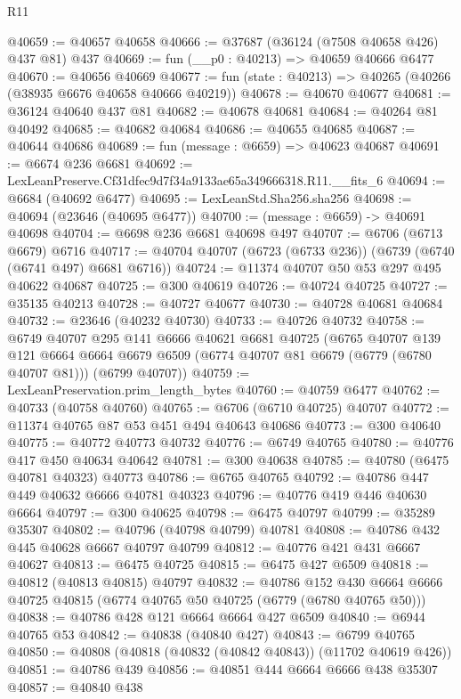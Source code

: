 \begin{lexlean}{R11}
\begin{coremodule}
@40659 := @40657 @40658
@40666 := @37687 (@36124 (@7508 @40658 @426) @437 @81) @437
@40669 := fun (__p0 : @40213) => @40659 @40666 @6477
@40670 := @40656 @40669
@40677 := fun (state : @40213) => @40265 (@40266 (@38935 @6676 @40658 @40666 @40219))
@40678 := @40670 @40677
@40681 := @36124 @40640 @437 @81
@40682 := @40678 @40681
@40684 := @40264 @81 @40492
@40685 := @40682 @40684
@40686 := @40655 @40685
@40687 := @40644 @40686
@40689 := fun (message : @6659) => @40623 @40687
@40691 := @6674 @236 @6681
@40692 := LexLeanPreserve.Cf31dfec9d7f34a9133ae65a349666318.R11.__fits_6
@40694 := @6684 (@40692 @6477)
@40695 := LexLeanStd.Sha256.sha256
@40698 := @40694 (@23646 (@40695 @6477))
@40700 := (message : @6659) -> @40691 @40698
@40704 := @6698 @236 @6681 @40698 @497
@40707 := @6706 (@6713 @6679) @6716
@40717 := @40704 @40707 (@6723 (@6733 @236)) (@6739 (@6740 (@6741 @497) @6681 @6716))
@40724 := @11374 @40707 @50 @53 @297 @495 @40622 @40687
@40725 := @300 @40619
@40726 := @40724 @40725
@40727 := @35135 @40213
@40728 := @40727 @40677
@40730 := @40728 @40681 @40684
@40732 := @23646 (@40232 @40730)
@40733 := @40726 @40732
@40758 := @6749
    @40707
    @295
    @141
    @6666
    @40621
    @6681
    @40725
    (@6765
      @40707
      @139
      @121
      @6664
      @6664
      @6679
      @6509
      (@6774 @40707 @81 @6679 (@6779 (@6780 @40707 @81)))
      (@6799 @40707))
@40759 := LexLeanPreservation.prim_length_bytes
@40760 := @40759 @6477
@40762 := @40733 (@40758 @40760)
@40765 := @6706 (@6710 @40725) @40707
@40772 := @11374 @40765 @87 @53 @451 @494 @40643 @40686
@40773 := @300 @40640
@40775 := @40772 @40773 @40732
@40776 := @6749 @40765
@40780 := @40776 @417 @450 @40634 @40642
@40781 := @300 @40638
@40785 := @40780 (@6475 @40781 @40323) @40773
@40786 := @6765 @40765
@40792 := @40786 @447 @449 @40632 @6666 @40781 @40323
@40796 := @40776 @419 @446 @40630 @6664
@40797 := @300 @40625
@40798 := @6475 @40797
@40799 := @35289 @35307
@40802 := @40796 (@40798 @40799) @40781
@40808 := @40786 @432 @445 @40628 @6667 @40797 @40799
@40812 := @40776 @421 @431 @6667 @40627
@40813 := @6475 @40725
@40815 := @6475 @427 @6509
@40818 := @40812 (@40813 @40815) @40797
@40832 := @40786
    @152
    @430
    @6664
    @6666
    @40725
    @40815
    (@6774 @40765 @50 @40725 (@6779 (@6780 @40765 @50)))
@40838 := @40786 @428 @121 @6664 @6664 @427 @6509
@40840 := @6944 @40765 @53
@40842 := @40838 (@40840 @427)
@40843 := @6799 @40765
@40850 := @40808 (@40818 (@40832 (@40842 @40843)) (@11702 @40619 @426))
@40851 := @40786 @439
@40856 := @40851 @444 @6664 @6666 @438 @35307
@40857 := @40840 @438

\end{coremodule}
\end{lexlean}
